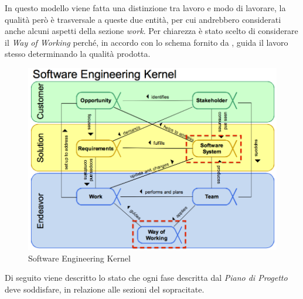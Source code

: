 	In questo modello viene fatta una distinzione tra lavoro e modo di lavorare, la qualità però è trasversale a queste due entità, per cui andrebbero considerati  anche alcuni aspetti della sezione \emph{work}. Per chiarezza è stato scelto di considerare il \emph{Way of Working} perché, in accordo con lo schema fornito da , guida il lavoro stesso determinando la qualità prodotta.
		
	\begin{figure}[h]
	\centering \includegraphics[width=1\textwidth]{Semat.png}
	\caption{Software Engineering Kernel}
	\end{figure}
	Di seguito viene descritto lo stato che ogni fase descritta dal \emph{Piano di Progetto} deve soddisfare, in relazione alle sezioni del  sopracitate.
   
